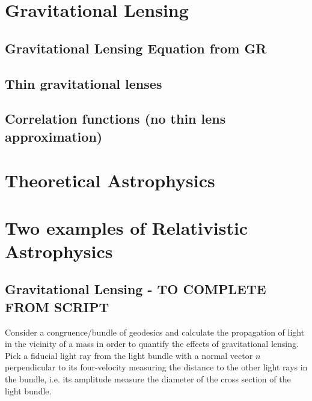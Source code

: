 



\section{Gravitational Lensing}
\subsection{Gravitational Lensing Equation from GR}
\subsection{Thin gravitational lenses}
\subsection{Correlation functions (no thin lens approximation)}
\section{Theoretical Astrophysics}








\newpage
\section{Two examples of Relativistic Astrophysics}
\subsection{Gravitational Lensing - TO COMPLETE FROM SCRIPT}
Consider a congruence/bundle of geodesics and calculate the propagation of light in the vicinity of a mass in order to quantify the effects of gravitational lensing. Pick a fiducial light ray from the light bundle with a normal vector $n$ perpendicular to its four-velocity measuring the distance to the other light rays in the bundle, i.e. its amplitude measure the diameter of the cross section of the light bundle.\\

